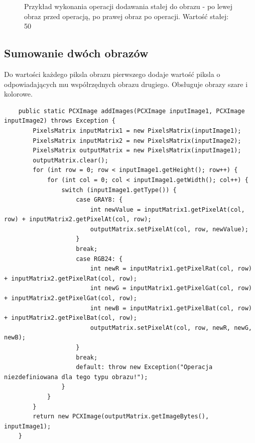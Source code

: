 \documentclass{article}
\begin{document}
\begin{figure}[!ht]
	\caption{Przykład wykonania operacji dodawania stałej do obrazu - po lewej obraz przed operacją, po prawej obraz po operacji. Wartość stałej: 50 }
	\label{fig1}	
	\end{figure}
	
	
	\subsection{Sumowanie dwóch obrazów}
	Do wartości każdego piksla obrazu pierwszego dodaje wartość piksla o odpowiadających mu współrzędnych obrazu drugiego. Obsługuje obrazy szare i kolorowe.
	
	\begin{verbatim}
	public static PCXImage addImages(PCXImage inputImage1, PCXImage inputImage2) throws Exception {
        PixelsMatrix inputMatrix1 = new PixelsMatrix(inputImage1);
        PixelsMatrix inputMatrix2 = new PixelsMatrix(inputImage2);
        PixelsMatrix outputMatrix = new PixelsMatrix(inputImage1);
        outputMatrix.clear();
        for (int row = 0; row < inputImage1.getHeight(); row++) {
            for (int col = 0; col < inputImage1.getWidth(); col++) {
                switch (inputImage1.getType()) {
                    case GRAY8: {
                        int newValue = inputMatrix1.getPixelAt(col, row) + inputMatrix2.getPixelAt(col, row);
                        outputMatrix.setPixelAt(col, row, newValue);
                    }
                    break;
                    case RGB24: {
                        int newR = inputMatrix1.getPixelRat(col, row) + inputMatrix2.getPixelRat(col, row);
                        int newG = inputMatrix1.getPixelGat(col, row) + inputMatrix2.getPixelGat(col, row);
                        int newB = inputMatrix1.getPixelBat(col, row) + inputMatrix2.getPixelBat(col, row);
                        outputMatrix.setPixelAt(col, row, newR, newG, newB);
                    }
                    break;
                    default: throw new Exception("Operacja niezdefiniowana dla tego typu obrazu!");
                }
            }
        }
        return new PCXImage(outputMatrix.getImageBytes(), inputImage1);
    }
	\end{verbatim}
	
\end{document}
